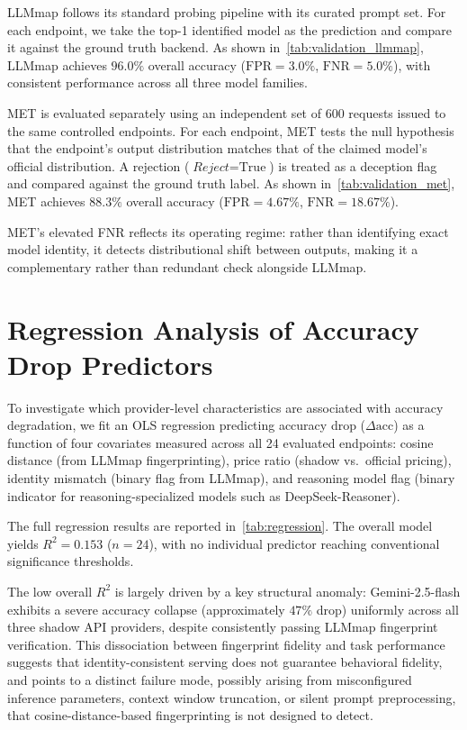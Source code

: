 \documentclass[letterpaper,twocolumn,10pt]{article}
\begin{document}
LLMmap follows its standard probing pipeline with its curated prompt set.
For each endpoint, we take the top-1 identified model as the prediction and compare it against the ground truth backend.
As shown in~\autoref{tab:validation_llmmap}, LLMmap achieves $96.0\%$ overall accuracy ($\text{FPR}{=}3.0\%$, $\text{FNR}{=}5.0\%$), with consistent performance across all three model families.

MET is evaluated separately using an independent set of 600 requests issued to the same controlled endpoints.
For each endpoint, MET tests the null hypothesis that the endpoint's output distribution matches that of the claimed model's official distribution.
A rejection ($\textit{Reject}{=}\text{True}$) is treated as a deception flag and compared against the ground truth label.
As shown in~\autoref{tab:validation_met}, MET achieves $88.3\%$ overall accuracy ($\text{FPR}{=}4.67\%$, $\text{FNR}{=}18.67\%$).

MET's elevated FNR reflects its operating regime: rather than identifying exact model identity, it detects distributional shift between outputs, making it a complementary rather than redundant check alongside LLMmap.

\section{Regression Analysis of Accuracy Drop Predictors}
\label{appendix:regression}

To investigate which provider-level characteristics are associated with accuracy degradation, we fit an OLS regression predicting accuracy drop ($\Delta\text{acc}$) as a function of four covariates measured across all 24 evaluated endpoints: cosine distance (from LLMmap fingerprinting), price ratio (shadow vs.\ official pricing), identity mismatch (binary flag from LLMmap), and reasoning model flag (binary indicator for reasoning-specialized models such as DeepSeek-Reasoner).

The full regression results are reported in~\autoref{tab:regression}.
The overall model yields $R^2 = 0.153$ ($n = 24$), with no individual predictor reaching conventional significance thresholds.

The low overall $R^2$ is largely driven by a key structural anomaly: Gemini-2.5-flash exhibits a severe accuracy collapse (approximately $47\%$ drop) uniformly across all three shadow API providers, despite consistently passing LLMmap fingerprint verification.
This dissociation between fingerprint fidelity and task performance suggests that identity-consistent serving does not guarantee behavioral fidelity, and points to a distinct failure mode, possibly arising from misconfigured inference parameters, context window truncation, or silent prompt preprocessing, that cosine-distance-based fingerprinting is not designed to detect.
\end{document}
